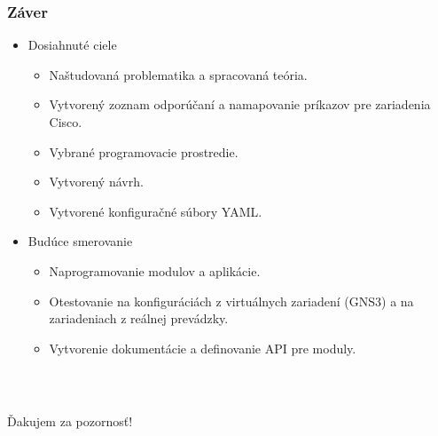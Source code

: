 \documentclass[%
  12pt,       				%
	t,                  %
	aspectratio=1610,   %
	unicode,						%
]{beamer}				    	%
\begin{document}
\begin{frame} 
	\frametitle{Záver}
	
	\begin{itemize}
		\item Dosiahnuté ciele	
			\begin{itemize}
				\item Naštudovaná problematika a spracovaná teória.
				\item Vytvorený zoznam odporúčaní a namapovanie príkazov pre zariadenia Cisco.
				\item Vybrané programovacie prostredie.
				\item Vytvorený návrh.
				\item Vytvorené konfiguračné súbory YAML.
			\end{itemize}
		\item Budúce smerovanie
			\begin{itemize}
				\item Naprogramovanie modulov a aplikácie.
				\item Otestovanie na konfiguráciách z virtuálnych zariadení (GNS3) a na zariadeniach z reálnej prevádzky.
				\item Vytvorenie dokumentácie a definovanie API pre moduly.
			\end{itemize}
	\end{itemize}

\end{frame}


\begin{frame}[c] 
	\frametitle{\mbox{ }}
	\begin{center}
		{\Huge Ďakujem za pozornosť!}
	\end{center}
\end{frame}
\end{document}
